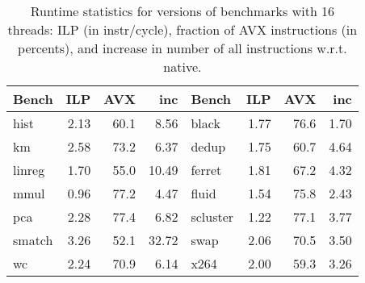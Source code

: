 

\begin{table*}[t]
\footnotesize
\centering

\begin{tabular}{l | r r r || l | r r r}
\bfseries Bench & \bfseries ILP & \bfseries AVX & \bfseries inc & \bfseries Bench & \bfseries ILP & \bfseries AVX & \bfseries inc \\
\hline                    
\hline
hist      & 2.13  & 60.1  &  8.56 & black    & 1.77 & 76.6 & 1.70 \\
km        & 2.58  & 73.2  &  6.37 & dedup    & 1.75 & 60.7 & 4.64 \\
linreg    & 1.70  & 55.0  & 10.49 & ferret   & 1.81 & 67.2 & 4.32 \\
mmul      & 0.96  & 77.2  &  4.47 & fluid    & 1.54 & 75.8 & 2.43 \\
pca       & 2.28  & 77.4  &  6.82 & scluster & 1.22 & 77.1 & 3.77 \\
smatch    & 3.26  & 52.1  & 32.72 & swap     & 2.06 & 70.5 & 3.50 \\
wc        & 2.24  & 70.9  &  6.14 & x264     & 2.00 & 59.3 & 3.26 \\
\hline
\end{tabular}


\caption{Runtime statistics for versions of benchmarks with 16 threads: ILP (in instr/cycle), fraction of AVX instructions (in percents), and increase in number of all instructions w.r.t. native.}
\label{tab:apps}

\end{table*}

